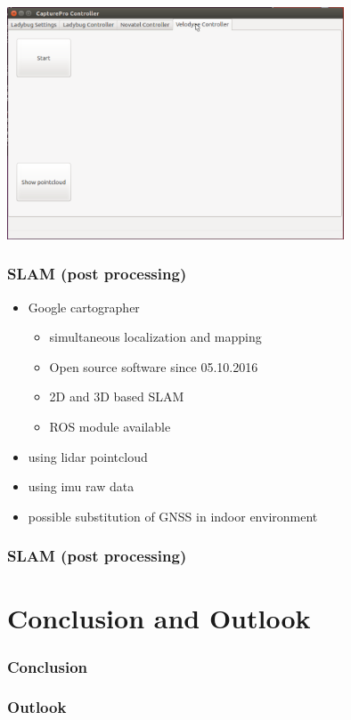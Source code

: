 \documentclass[aspectratio=169]{beamer}
\begin{document}
  \begin{frame}
   \begin{center}
    \includegraphics[width=10cm]{./Abbildungen/GUI_4.png}
   \end{center}
  \end{frame}
  
  \begin{frame}
   \frametitle{SLAM (post processing)}
   \begin{itemize} 
    \item Google cartographer
    \begin{itemize}
     \item simultaneous localization and mapping
     \item Open source software since 05.10.2016
     \item 2D and 3D based SLAM
     \item ROS module available
    \end{itemize}
    \item using lidar pointcloud
    \item using imu raw data
    \item possible substitution of GNSS in indoor environment
   \end{itemize}
  \end{frame}
  
  \begin{frame}
   \frametitle{SLAM (post processing)}
  \end{frame}



\section{Conclusion and Outlook}

\begin{frame}
 \frametitle{Conclusion}
\end{frame}

\begin{frame}
 \frametitle{Outlook}
\end{frame}
\end{document}
